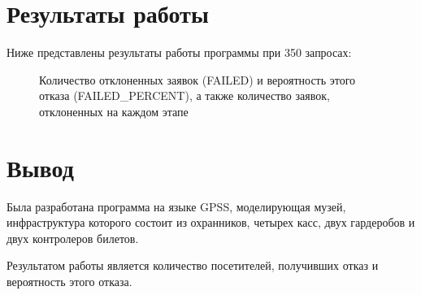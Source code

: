 \section*{Результаты работы}
Ниже представлены результаты работы программы при 350 запросах:

\begin{figure}[h]
	\caption{Количество отклоненных заявок (FAILED) и вероятность этого отказа (FAILED\_PERCENT), а также количество заявок, отклоненных на каждом этапе}
	\label{ris:image1}
\end{figure}

\newpage

\section*{Вывод}
Была разработана программа на языке GPSS, моделирующая музей, инфраструктура которого состоит из охранников, четырех касс, двух гардеробов и двух контролеров билетов.

Результатом работы является количество посетителей, получивших отказ и вероятность этого отказа.